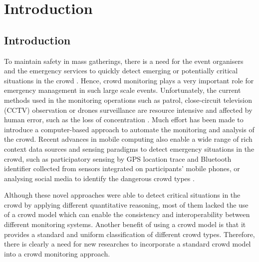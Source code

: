 \chapter{Introduction}  %
\label{ch:intro}
\ifpdf
    \graphicspath{{Chapter1/Figs/Raster/}{Chapter1/Figs/PDF/}{Chapter1/Figs/}}
\else
    \graphicspath{{Chapter1/Figs/Vector/}{Chapter1/Figs/}}
\fi

\section{Introduction}

To maintain safety in mass gatherings, there is a need for the event organisers and the emergency services to quickly detect emerging or potentially critical situations in the crowd \citep{Wirz2012} . Hence, crowd monitoring plays a very important role for emergency management in such large scale events. Unfortunately, the current methods used in the monitoring operations such as patrol, close-circuit television (CCTV) observation or drones surveillance are resource intensive and affected by human error, such as the loss of concentration \citep{Davies1995}. Much effort has been made to introduce a computer-based approach to automate the monitoring and analysis of the crowd. Recent advances in mobile computing also enable a wide range of rich context data sources and sensing paradigms to detect emergency situations in the crowd, such as participatory sensing by GPS location trace \citep{Wirz2012} and Bluetooth identifier \citep{Weppner2013} collected from sensors integrated on participants' mobile phones, or analysing social media to identify the dangerous crowd types \citep{DelirHaghighi2013}.

Although these novel approaches were able to detect critical situations in the crowd by applying different quantitative reasoning, most of them lacked the use of a crowd model which can enable the consistency and interoperability between different monitoring systems. Another benefit of using a crowd model is that it provides a standard and uniform classification of different crowd types. Therefore, there is clearly a need for new researches to incorporate a standard crowd model into a crowd monitoring approach.

